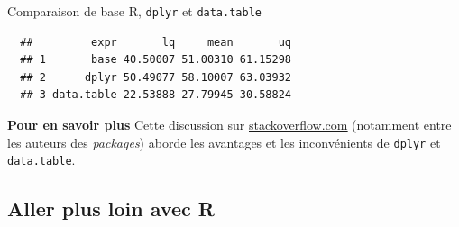 \documentclass[12pt,ignorenonframetext,]{beamer}
\newenvironment{Shaded}{}{}
\newcommand{\KeywordTok}[1]{\textcolor[rgb]{0.00,0.00,1.00}{#1}}
\newcommand{\DataTypeTok}[1]{#1}
\newcommand{\StringTok}[1]{\textcolor[rgb]{0.00,0.50,0.50}{#1}}
\newcommand{\CommentTok}[1]{\textcolor[rgb]{0.00,0.50,0.00}{#1}}
\newcommand{\OperatorTok}[1]{#1}
\newcommand{\NormalTok}[1]{#1}
\renewenvironment{Shaded}{\begin{snugshade}}{\end{snugshade}}
\begin{document}
\begin{frame}[fragile]{Comparaison de base R, \texttt{dplyr} et
\texttt{data.table}}

\footnotesize

\begin{Shaded}
\end{Shaded}

\vspace{-5mm}

\begin{verbatim}
  ##         expr       lq     mean       uq
  ## 1       base 40.50007 51.00310 61.15298
  ## 2      dplyr 50.49077 58.10007 63.03932
  ## 3 data.table 22.53888 27.79945 30.58824
\end{verbatim}

\normalsize

\textbf{Pour en savoir plus} Cette discussion sur
\href{http://stackoverflow.com/questions/21435339/data-table-vs-dplyr-can-one-do-something-well-the-other-cant-or-does-poorly}{\underline{stackoverflow.com}}
(notamment entre les auteurs des \emph{packages}) aborde les avantages
et les inconvénients de \texttt{dplyr} et \texttt{data.table}.

\end{frame}

\subsection{Aller plus loin avec R}\label{aller-plus-loin-avec-r}
\end{document}
